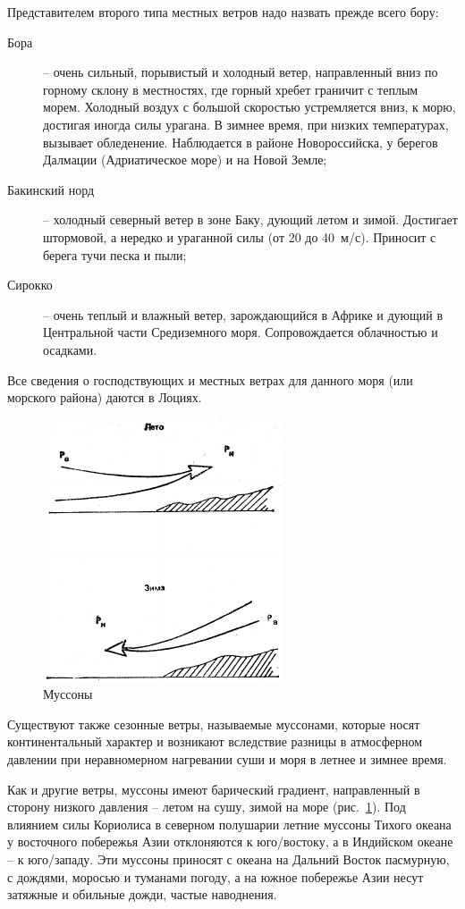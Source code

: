 \documentclass[a4paper, 12pt, twoside, final, book, russian, fittopage, cyremdash]{ncc}
\newcommand{\ris}[1]{\ref{fig:#1}}
\begin{document}
Представителем второго типа местных ветров надо назвать прежде всего бору:
\begin{description}
\item[Бора] \--- очень сильный, порывистый и холодный ветер, направленный вниз по горному склону в местностях, где горный хребет граничит с теплым морем. Холодный воздух с большой скоростью устремляется вниз, к морю, достигая иногда силы урагана. В зимнее время, при низких температурах, вызывает обледенение. Наблюдается в районе Новороссийска, у берегов Далмации (Адриатическое море) и на Новой Земле;
\item[Бакинский норд] \--- холодный северный ветер в зоне Баку, дующий летом и зимой. Достигает штормовой, а нередко и ураганной силы (от 20 до 40~м/с). Приносит с берега тучи песка и пыли;
\item[Сирокко] \--- очень теплый и влажный ветер, зарождающийся в Африке и дующий в Центральной части Средиземного моря. Сопровождается облачностью и осадками.
\end{description}

Все сведения о господствующих и местных ветрах для данного моря (или морского района) даются в Лоциях.

\begin{figure}[htb]
  \centering{}
  \includegraphics[scale=1.2]{0119P}
  \caption{Муссоны}
  \label{fig:119}
\end{figure}

Существуют также сезонные ветры, называемые муссонами, которые носят континентальный характер и возникают вследствие разницы в атмосферном давлении при неравномерном нагревании суши и моря в летнее и зимнее время.

Как и другие ветры, муссоны имеют барический градиент, направленный в сторону низкого давления \--- летом на сушу, зимой на море (рис.~\ris{119}). Под влиянием силы Кориолиса в северном полушарии летние муссоны Тихого океана у восточного побережья Азии отклоняются к юго\-/востоку, а в Индийском океане \--- к юго\-/западу. Эти муссоны приносят с океана на Дальний Восток пасмурную, с дождями, моросью и туманами погоду, а на южное побережье Азии несут затяжные и обильные дожди, частые наводнения.
\end{document}
